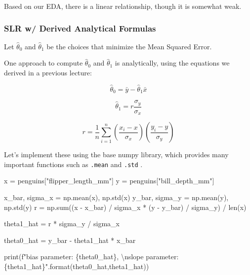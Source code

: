 \documentclass[
  letterpaper,
  DIV=11,
  numbers=noendperiod]{scrreprt}
\newenvironment{Shaded}{\begin{snugshade}}{\end{snugshade}}
\newcommand{\BuiltInTok}[1]{\textcolor[rgb]{0.00,0.23,0.31}{#1}}
\newcommand{\CharTok}[1]{\textcolor[rgb]{0.13,0.47,0.30}{#1}}
\newcommand{\NormalTok}[1]{\textcolor[rgb]{0.00,0.23,0.31}{#1}}
\newcommand{\OperatorTok}[1]{\textcolor[rgb]{0.37,0.37,0.37}{#1}}
\newcommand{\SpecialCharTok}[1]{\textcolor[rgb]{0.37,0.37,0.37}{#1}}
\newcommand{\SpecialStringTok}[1]{\textcolor[rgb]{0.13,0.47,0.30}{#1}}
\newcommand{\StringTok}[1]{\textcolor[rgb]{0.13,0.47,0.30}{#1}}
\begin{document}
Based on our EDA, there is a linear relationship, though it is somewhat
weak.

\hypertarget{slr-w-derived-analytical-formulas}{%
\subsubsection{SLR w/ Derived Analytical
Formulas}\label{slr-w-derived-analytical-formulas}}

Let \(\hat{\theta}_0\) and \(\hat{\theta}_1\) be the choices that
minimize the Mean Squared Error.

One approach to compute \(\hat{\theta}_0\) and \(\hat{\theta}_1\) is
analytically, using the equations we derived in a previous lecture:

\[\hat{\theta}_0 = \bar{y} - \hat{\theta}_1 \bar{x}\]

\[\hat{\theta}_1 = r \frac{\sigma_y}{\sigma_x}\]

\[r = \frac{1}{n} \sum_{i=1}^{n}\left( \frac{x_i - x}{\sigma_x} \right) \left( \frac{y_i - y}{\sigma_y} \right) \]

Let's implement these using the base numpy library, which provides many
important functions such as \texttt{.mean} and \texttt{.std} .

\begin{Shaded}
\begin{Highlighting}[]
\NormalTok{x }\OperatorTok{=}\NormalTok{ penguins[}\StringTok{"flipper\_length\_mm"}\NormalTok{]}
\NormalTok{y }\OperatorTok{=}\NormalTok{ penguins[}\StringTok{"bill\_depth\_mm"}\NormalTok{]}

\NormalTok{x\_bar, sigma\_x }\OperatorTok{=}\NormalTok{ np.mean(x), np.std(x)}
\NormalTok{y\_bar, sigma\_y }\OperatorTok{=}\NormalTok{ np.mean(y), np.std(y)}
\NormalTok{r }\OperatorTok{=}\NormalTok{ np.}\BuiltInTok{sum}\NormalTok{((x }\OperatorTok{{-}}\NormalTok{ x\_bar) }\OperatorTok{/}\NormalTok{ sigma\_x }\OperatorTok{*}\NormalTok{ (y }\OperatorTok{{-}}\NormalTok{ y\_bar) }\OperatorTok{/}\NormalTok{ sigma\_y) }\OperatorTok{/} \BuiltInTok{len}\NormalTok{(x)}

\NormalTok{theta1\_hat }\OperatorTok{=}\NormalTok{ r }\OperatorTok{*}\NormalTok{ sigma\_y }\OperatorTok{/}\NormalTok{ sigma\_x}

\NormalTok{theta0\_hat }\OperatorTok{=}\NormalTok{ y\_bar }\OperatorTok{{-}}\NormalTok{ theta1\_hat }\OperatorTok{*}\NormalTok{ x\_bar}

\BuiltInTok{print}\NormalTok{(}\SpecialStringTok{f"bias parameter: }\SpecialCharTok{\{}\NormalTok{theta0\_hat}\SpecialCharTok{\}}\SpecialStringTok{, }\CharTok{\textbackslash{}n}\SpecialStringTok{slope parameter: }\SpecialCharTok{\{}\NormalTok{theta1\_hat}\SpecialCharTok{\}}\SpecialStringTok{"}\NormalTok{.}\BuiltInTok{format}\NormalTok{(theta0\_hat,theta1\_hat))}
\end{Highlighting}
\end{Shaded}
\end{document}

